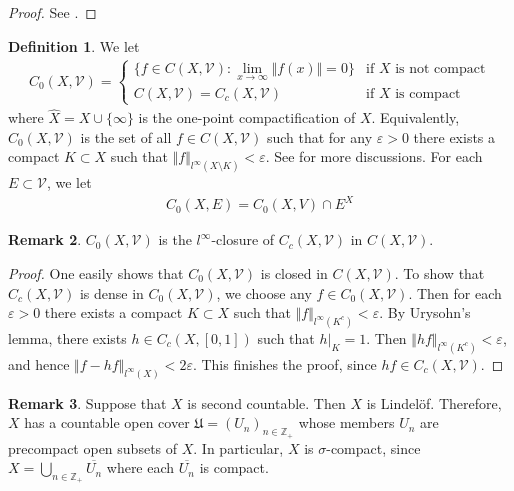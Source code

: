\documentclass[12pt,b5paper,notitlepage]{article}
\theoremstyle{definition}
\newtheorem{df}{Definition}[subsection]
\newtheorem{rem}[df]{Remark}
\theoremstyle{plain}
\newcommand{\fk}{\mathfrak}
\newcommand{\mc}{\mathcal}
\newcommand{\wht}{\widehat}
\newcommand{\ovl}{\overline}
\newcommand{\Zbb}{\mathbb Z}
\newcommand{\eps}{\varepsilon}
\numberwithin{equation}{section}
\begin{document}
\begin{proof}
See \cite[Sec. 15.4]{Gui-A}.
\end{proof}



\begin{df}
We let \index{C0@$C_0(X,\mc V),C_0(X,E)$}
\begin{align*}
C_0(X,\mc V)=\left\{
\begin{array}{ll}
\{f\in C(X,\mc V):\lim_{x\rightarrow\infty}\Vert f(x)\Vert=0\}&\text{if $X$ is not compact}\\[0.5ex]
C(X,\mc V)=C_c(X,\mc V)&\text{if $X$ is compact}
\end{array}
\right.
\end{align*}
where $\wht X=X\cup\{\infty\}$ is the one-point compactification of $X$. Equivalently, $C_0(X,\mc V)$ is the set of all $f\in C(X,\mc V)$ such that for any $\eps>0$ there exists a compact $K\subset X$ such that $\Vert f\Vert_{l^\infty(X\setminus K)}<\eps$. See \cite[Subsec. 15.8.1]{Gui-A} for more discussions. For each $E\subset\mc V$, we let
\begin{align*}
C_0(X,E)=C_0(X,V)\cap E^X
\end{align*}
\end{df}


\begin{rem}
$C_0(X,\mc V)$ is the $l^\infty$-closure of $C_c(X,\mc V)$ in $C(X,\mc V)$. 
\end{rem}

\begin{proof}
One easily shows that $C_0(X,\mc V)$ is closed in $C(X,\mc V)$. To show that $C_c(X,\mc V)$ is dense in $C_0(X,\mc V)$, we choose any $f\in C_0(X,\mc V)$. Then for each $\eps>0$ there exists a compact $K\subset X$ such that $\Vert f\Vert_{l^\infty(K^c)}<\eps$. By Urysohn's lemma, there exists $h\in C_c(X,[0,1])$ such that $h|_K=1$. Then $\Vert hf\Vert_{l^\infty(K^c)}<\eps$, and hence $\Vert f-hf\Vert_{l^\infty(X)}<2\eps$. This finishes the proof, since $hf\in C_c(X,\mc V)$.
\end{proof}

\begin{rem}\label{lb84}
Suppose that $X$ is second countable. Then $X$ is Lindel\"of. Therefore, $X$ has a countable open cover $\fk U=(U_n)_{n\in\Zbb_+}$ whose members $U_n$ are precompact open subsets of $X$. In particular, $X$ is $\sigma$-compact, since $X=\bigcup_{n\in\Zbb_+}\ovl{U_n}$ where each $\ovl{U_n}$ is compact.
\end{rem}
\end{document}
